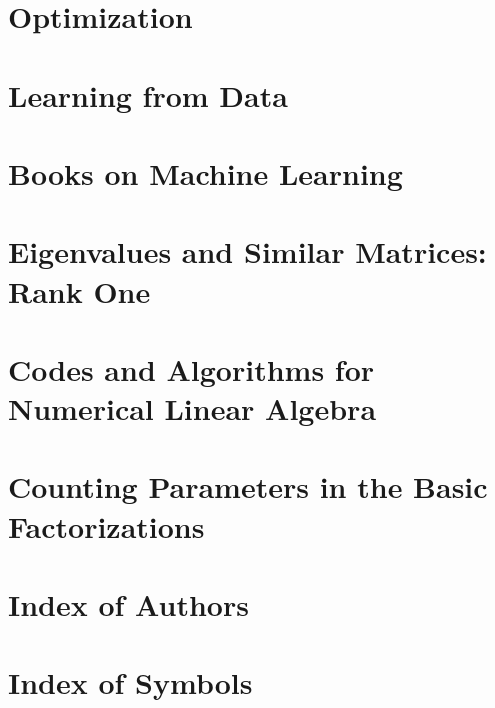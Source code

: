 \documentclass[a4paper]{article}
\begin{document}
\section{Optimization}

\section{Learning from Data}

\section{Books on Machine Learning}

\section{Eigenvalues and Similar Matrices: Rank One}

\section{Codes and Algorithms for Numerical Linear Algebra}

\section{Counting Parameters in the Basic Factorizations}

\section{Index of Authors}

\section{Index of Symbols}
\end{document}

